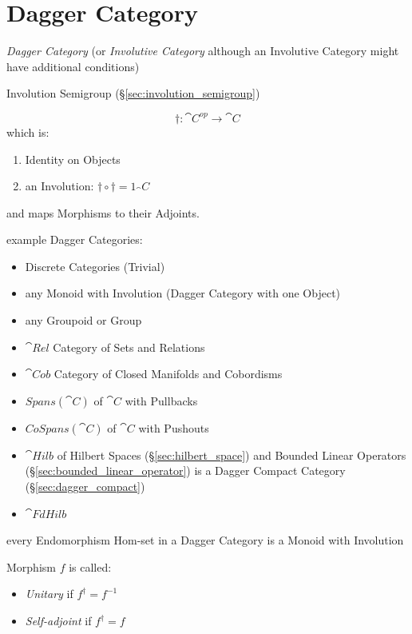 


\section{Dagger Category}\label{sec:dagger_category}

\emph{Dagger Category} (or \emph{Involutive Category} although an Involutive
Category might have additional conditions) %

Involution Semigroup (\S\ref{sec:involution_semigroup})

\[
  \dag : \cat{C}^{op} \rightarrow \cat{C}
\]
which is:
\begin{enumerate}
  \item Identity on Objects
  \item an Involution: $\dag \circ \dag = 1_\cat{C}$
\end{enumerate}
and maps Morphisms to their Adjoints. %

example Dagger Categories:
\begin{itemize}
  \item Discrete Categories (Trivial)
  \item any Monoid with Involution (Dagger Category with one Object)
  \item any Groupoid or Group
  \item $\cat{Rel}$ Category of Sets and Relations
  \item $\cat{Cob}$ Category of Closed Manifolds and Cobordisms
  \item $Spans(\cat{C})$ of $\cat{C}$ with Pullbacks
  \item $CoSpans(\cat{C})$ of $\cat{C}$ with Pushouts
  \item $\cat{Hilb}$ of Hilbert Spaces (\S\ref{sec:hilbert_space}) and
    Bounded Linear Operators (\S\ref{sec:bounded_linear_operator}) is
    a Dagger Compact Category (\S\ref{sec:dagger_compact})
  \item $\cat{FdHilb}$
\end{itemize}

every Endomorphism Hom-set in a Dagger Category is a Monoid with Involution

Morphism $f$ is called:
\begin{itemize}
  \item \emph{Unitary} if $f^\dag = f^{-1}$
  \item \emph{Self-adjoint} if $f^\dag = f$
\end{itemize}

